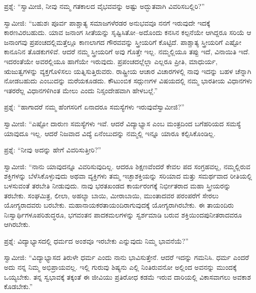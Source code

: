 \vskip 5pt

ಪ್ರಶ್ನೆ: “ಸ್ವಾಮೀಜಿ, ನೀವು ನಮ್ಮ ಗತಕಾಲದ ವೈಭವವನ್ನು ಅಷ್ಟು ಅದ್ಭುತವಾಗಿ ವಿವರಿಸಬಲ್ಲಿರಿ?”

\vskip 5pt

ಸ್ವಾಮೀಜಿ: “ಬಹುಶಃ ಪೂರ್ವ ಪಾಶ್ಚಾತ್ಯ ಸಮಾಜಗಳೆರಡರ ಅನುಭವವೂ ನನಗೆ ಇರುವುದೇ ಇದಕ್ಕೆ ಕಾರಣವಿರಬಹುದು. ಯಾವ ಜನಾಂಗ ಸೀತೆಯನ್ನು ಸೃಷ್ಟಿಸಿತೋ–ಅದೊಂದು ಕನಸಿನ ಕಲ್ಪನೆಯೇ ಆಗಿದ್ದರೂ ಸರಿಯೆ ಆ ಜನಾಂಗವು ಪ್ರಪಂಚದಲ್ಲಿ\break ಮತ್ತೆಲ್ಲೂ ಕಾಣಲಾಗದ ಗೌರವವನ್ನು ಸ್ತ್ರೀಯರಿಗೆ ಕೊಟ್ಟಿದೆ. ಪಾಶ್ಚಾತ್ಯ ಸ್ತ್ರೀಯರಿಗೆ ಎಷ್ಟೋ ಕಾನೂನಿನ ತೊಡಕುಗಳಿವೆ. ಆದರೆ ನಮ್ಮ ಸ್ತ್ರೀಯರಿಗೆ ಅವು ಗೊತ್ತೇ ಇಲ್ಲ. ನಮ್ಮಲ್ಲಿಯೂ ತಪ್ಪು ಇದೆ, ವಿನಾಯಿತಿ ಇದೆ. ಇದರಂತೆಯೇ ಅವರಲ್ಲಿಯೂ ಹಾಗೆಯೇ ಇರುವುದು. ಪ್ರಪಂಚದಲ್ಲೆಲ್ಲಾ ಎಲ್ಲರೂ ಪ್ರೀತಿ, ಮಾಧುರ್ಯ, ಋಜುತ್ವಗಳನ್ನು ವ್ಯಕ್ತಗೊಳಿಸಲು ಯತ್ನಿಸುತ್ತಿರುವರು. ರಾಷ್ಟ್ರೀಯ ಆಚಾರ ವಿಚಾರಗಳಲ್ಲಿ ನಾವು ಇದನ್ನು ಬಹಳ ಚೆನ್ನಾಗಿ ನೋಡಬಹುದು ಎಂಬುದನ್ನು ಮರೆಯಕೂಡದು. ಕೌಟುಂಬಿಕ ಸದ್ಗುಣಗಳ ವಿಷಯದಲ್ಲಿ ನಮ್ಮ ಭಾರತೀಯ ವಿಧಾನಗಳು ಇತರರೆಲ್ಲ ವಿಧಾನಗಳಿಗಿಂತ ಮೇಲು ಎಂದು ನಿಸ್ಸಂದೇಹವಾಗಿ ಹೇಳಬಲ್ಲೆ.”

\vskip 5pt

ಪ್ರಶ್ನೆ: “ಹಾಗಾದರೆ ನಮ್ಮ ಹೆಂಗಸರಿಗೆ ಏನಾದರೂ ಸಮಸ್ಯೆಗಳು ಇರುವುವೆ\break ಸ್ವಾಮೀಜಿ?”

\vskip 5pt

ಸ್ವಾಮೀಜಿ: “ಎಷ್ಟೋ ದಾರುಣ ಸಮಸ್ಯೆಗಳು ಇವೆ. ಆದರೆ ವಿದ್ಯಾಭ್ಯಾಸ ಎಂಬ ಮಂತ್ರದಿಂದ ಬಗೆಹರಿಯದ ಸಮಸ್ಯೆ ಯಾವುದೂ ಇಲ್ಲ. ಆದರೆ ನಿಜವಾದ ವಿದ್ಯೆ ಏನೆಂಬುದನ್ನು ನಮ್ಮಲ್ಲಿ ಇನ್ನೂ ಯಾರೂ ಕಲ್ಪಿಸಿಕೊಂಡಿಲ್ಲ.

\vskip 5pt

ಪ್ರಶ್ನೆ: “ನೀವು ಅದನ್ನು ಹೇಗೆ ವಿವರಿಸುತ್ತೀರಿ?”

\eject

ಸ್ವಾಮೀಜಿ: “ನಾನು ಯಾವುದನ್ನೂ ವಿವರಿಸುವುದಿಲ್ಲ. ಆದರೂ ಶಿಕ್ಷಣವೆಂದರೆ ಕೇವಲ ಪದ ಸಂಗ್ರಹವಲ್ಲ, ನಮ್ಮಲ್ಲಿರುವ ಶಕ್ತಿಗಳನ್ನು ಬೆಳೆಸಿಕೊಳ್ಳುವುದು ಅಥವಾ ವ್ಯಕ್ತಿಗಳು ತಮ್ಮ ಇಚ್ಛಾಶಕ್ತಿಯನ್ನು ಸರಿಯಾದ ಮತ್ತು ಸಮರ್ಥವಾದ ರೀತಿಯಲ್ಲಿ ಬಳಸುವಂತೆ ತರಬೇತಿ ನೀಡುವುದು. ನಾವು ಭರತಖಂಡದ ಕಾರ್ಯರಂಗಕ್ಕೆ ನಿರ್ಭೀತರಾದ ಮಹಾ ಸ್ತ್ರೀಯರನ್ನು ತರಬೇಕು. ಸಂಘಮಿತ್ರ, ಲೀಲಾ, ಅಹಲ್ಯಾ ಬಾಯಿ, ಮೀರಾಬಾಯಿ, ಮುಂತಾದವರ ಪರಂಪರೆಗೆ ಸೇರಲು ಯೋಗ್ಯರಾದವರು ಬರಬೇಕು. ಮಹಾನಾಯಕರ\break ತಾಯಂದಿರಾಗುವುದಕ್ಕೆ ಯೋಗ್ಯರಾಗಿರಬೇಕು. ಈ ತಾಯಂದಿರು ನಿಃಸ್ವಾರ್ಥಿಗಳೂ\break ಪರಿಶುದ್ಧರೂ, ಭಗವಂತನ ಪಾದಕಮಲಗಳನ್ನು ಸ್ವರ್ಶಮಾಡಿ ಬರುವ ಶಕ್ತಿಯಿಂದ\break ಪುನೀತರಾದವರೂ ಆಗಿರಬೇಕು.

\vskip 5pt

ಪ್ರಶ್ನೆ: ವಿದ್ಯಾಭ್ಯಾಸದಲ್ಲಿ ಧರ್ಮದ ಅಂಶವೂ ಇರಬೇಕು ಎನ್ನುವುದು ನಿಮ್ಮ ಭಾವನೆಯೆ?”

\vskip 5pt

ಸ್ವಾಮೀಜಿ: “ವಿದ್ಯಾಭ್ಯಾಸದ ತಿರುಳೇ ಧರ್ಮ ಎಂದು ನಾನು ಭಾವಿಸುತ್ತೇನೆ. ಆದರೆ ಇದನ್ನು ಗಮನಿಸಿ. ಧರ್ಮ ಎಂದರೆ ಅದು ನನ್ನ ನಿಮ್ಮ ಅಭಿಪ್ರಾಯವಲ್ಲ. ಇಲ್ಲಿ ಗುರುವು ಶಿಷ್ಯನು ಎಲ್ಲಿ ನಿಂತಿರುವನೋ ಅಲ್ಲಿಂದ ಅವನನ್ನು ಮುಂದಕ್ಕೆ ಒಯ್ಯಬೇಕು. ತನ್ನ ಸ್ವಭಾವಕ್ಕೆ ತಕ್ಕಂತೆ ಈ ಜೀವಿಯು ಪ್ರತಿರೋಧ ಕಡಮೆ ಇರುವ ದಾರಿಯಲ್ಲಿ ವಿಕಾಸವಾಗಲು ಅವಕಾಶ ಕೊಡಬೇಕು.”

